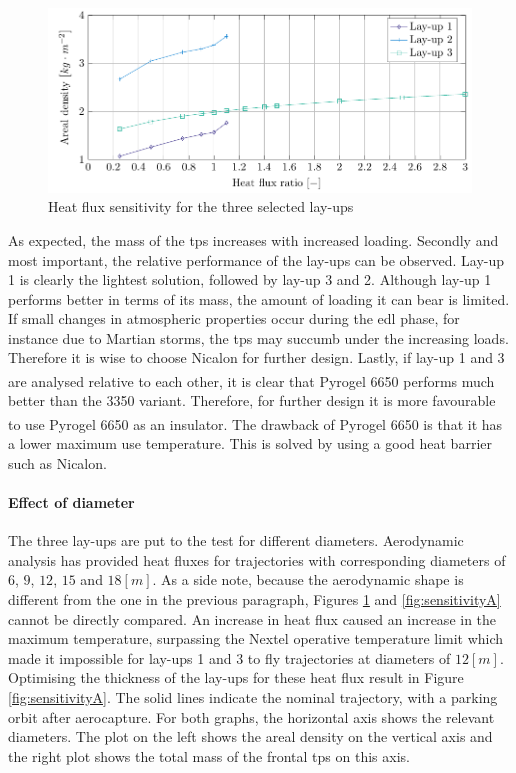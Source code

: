 \begin{figure}[h]
	\centering
	\includegraphics{./Figure/Thermal/Sensitivityq.pdf}
	\caption{Heat flux sensitivity for the three selected lay-ups}
	\label{fig:sensitivityq}
\end{figure}


As expected, the mass of the \gls{tps} increases with increased loading. Secondly and most important, the relative performance of the lay-ups can be observed. Lay-up 1 is clearly the lightest solution, followed by lay-up 3 and 2. Although lay-up 1 performs better in terms of its mass, the amount of loading it can bear is limited. If small changes in atmospheric properties occur during the \gls{edl} phase, for instance due to Martian storms, the \gls{tps} may succumb under the increasing loads. Therefore it is wise to choose Nicalon for further design. Lastly, if lay-up 1 and 3 are analysed relative to each other, it is clear that Pyrogel\textsuperscript{\textregistered} 6650 performs much better than the 3350 variant. Therefore, for further design it is more favourable to use Pyrogel\textsuperscript{\textregistered} 6650 as an insulator. The drawback of Pyrogel\textsuperscript{\textregistered} 6650 is that it has a lower maximum use temperature. This is solved by using a good heat barrier such as Nicalon.

\paragraph{Effect of diameter}
The three lay-ups are put to the test for different diameters. Aerodynamic analysis has provided heat fluxes for trajectories with corresponding diameters of $6$, $9$, $12$, $15$ and $18 \left[ m \right]$. As a side note, because the aerodynamic shape is different from the one in the previous paragraph, Figures \ref{fig:sensitivityq} and \ref{fig:sensitivityA} cannot be directly compared. An increase in heat flux caused an increase in the maximum temperature, surpassing the Nextel operative temperature limit which made it impossible for lay-ups 1 and 3 to fly trajectories at diameters of $12 \left[ m \right]$. Optimising the thickness of the lay-ups for these heat flux result in Figure \ref{fig:sensitivityA}. The solid lines indicate the nominal trajectory, with a parking orbit after aerocapture. For both graphs, the horizontal axis shows the relevant diameters. The plot on the left shows the areal density on the vertical axis and the right plot shows the total mass of the frontal \gls{tps} on this axis.

